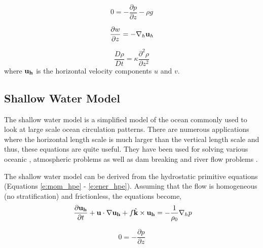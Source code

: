 \begin{equation}\label{e:zmom_hpe}
    0 = - \frac{\partial p}{\partial z} - \rho g
\end{equation}

\begin{equation}\label{e:cont_hpe}
   \frac{\partial w}{\partial z} = - \nabla_{h}{\bf u}_{h} 
\end{equation}

\begin{equation}\label{e:ener_hpe}
   \frac{D \rho}{D t}  = \kappa \frac{\partial^2 \rho}{\partial z^2}
\end{equation}
where ${\bf u_h}$ is the horizontal velocity components $u$ and $v$.  

\subsection{Shallow Water Model}

The shallow water model is a simplified model of the ocean commonly used to look at large scale ocean circulation patterns.  There are numerous applications where the horizontal length scale is much larger than the vertical length scale and thus, these equations are quite useful.  They have been used for solving various oceanic \cite{07BCLDR, 04BILH}, atmospheric problems as well as dam breaking \cite{06RSS, 02bSZ} and river flow problems \cite{94Vreug}.  

The shallow water model can be derived from the hydrostatic primitive equations (Equations \ref{e:mom_hpe} - \ref{e:ener_hpe}).  Assuming that the flow is homogeneous (no stratification) and frictionless, the equations become, 
%
\begin{equation}\label{e:mom_temp}
    \ \frac{\partial {\bf u_h}}{\partial t} + {\bf u} \cdot \nabla {\bf u_h}   + f  \hat{\bf k} \times {\bf u_h}= - \frac{1}{\rho_0} \nabla_h p 
\end{equation}

\begin{equation}\label{e:zmom_temp}
    0 = - \frac{\partial p}{\partial z} 
\end{equation}

